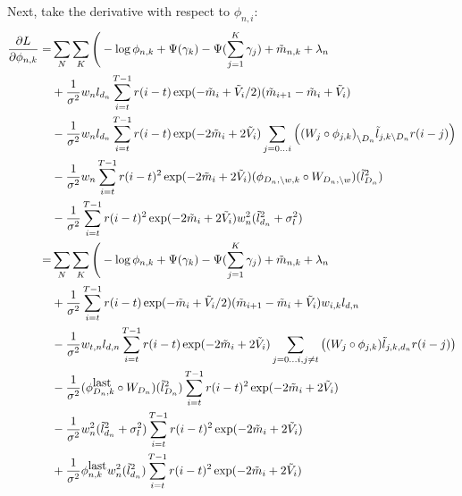 Next, take the derivative with respect to $\phi_{n,i}$:
\begin{align}
  \label{eq:phi_term}
  \frac{\partial L}{\partial \phi_{n,k}}
 = & \sum_N \sum_K \Bigg( -\log{\phi_{n,k}} + \Psi(\gamma_k) - \Psi(\sum_{j=1}^K \gamma_j) + \tilde{m}_{n,k} + \lambda_n \\  \nonumber
&  + \frac{1}{\sigma^2} w_{n} l_{d_n} \sum_{i=t}^{T-1} r(i-t) \exp(-\tilde{m}_i + \tilde{V}_i / 2) (\tilde{m}_{i + 1} - \tilde{m}_i + \tilde{V}_i) \\  \nonumber
&  - \frac{1}{\sigma^2} w_{n} l_{d_n} \sum_{i=t}^{T-1} r(i-t) \exp(-2\tilde{m}_i + 2 \tilde{V}_i) \sum_{j=0\ldots i} \left( {({W_j} \circ {\phi_{j,k}})}_{\setminus D_n} \tilde{l}_{j,k\setminus D_n} r(i-j) \right) \\  \nonumber
&  - \frac{1}{\sigma^2} w_{n} \sum_{i=t}^{T-1} r(i-t)^2 \exp(-2\tilde{m}_i + 2 \tilde{V}_i) (\phi_{D_n, \setminus w,k} \circ W_{D_n, \setminus w}) ({\tilde{l}}_{D_n}^2) \\  \nonumber
&  - \frac{1} {\sigma^2} \sum_{i=t}^{T-1} r(i-t)^2 \exp(-2\tilde{m}_i + 2 \tilde{V}_i) w_{n}^2 ({\tilde{l}}_{d_n}^2 + \sigma_l^2) \\  \nonumber
 = & \sum_N \sum_K \Bigg( -\log{\phi_{n,k}} + \Psi(\gamma_k) - \Psi(\sum_{j=1}^K \gamma_j) + \tilde{m}_{n,k} + \lambda_n \\  \nonumber
&  + \frac{1}{\sigma^2} \sum_{i=t}^{T-1} r(i-t) \exp(-\tilde{m}_i + \tilde{V}_i / 2) (\tilde{m}_{i + 1} - \tilde{m}_i + \tilde{V}_i) w_{i,k} l_{d,n} \\  \nonumber
&  - \frac{1} {\sigma^2} w_{t,n} l_{d,n} \sum_{i=t}^{T-1} r(i-t) \exp(-2\tilde{m}_i + 2 \tilde{V}_i) \sum_{j=0\ldots i, j \neq t} \left( (W_{j} \circ \phi_{j,k}) \tilde{l}_{j,k,d_n} r(i-j) \right) \\  \nonumber
&  - \frac{1} {\sigma^2} (\phi_{D_n,k}^{\mbox{last}} \circ W_{D_n}) (\tilde{l}_{D_n}^2) \sum_{i=t}^{T-1} r(i-t)^2 \exp(-2\tilde{m}_i + 2 \tilde{V}_i) \\  \nonumber
&  - \frac{1} {\sigma^2} w_{n}^2 (\tilde{l}_{d_n}^2 + \sigma_l^2) \sum_{i=t}^{T-1} r(i-t)^2 \exp(-2\tilde{m}_i + 2 \tilde{V}_i) \\  \nonumber
&  + \frac{1} {\sigma^2} \phi_{n,k}^{\mbox{last}} w_{n}^2 (\tilde{l}_{d_n}^2) \sum_{i=t}^{T-1} r(i-t)^2 \exp(-2\tilde{m}_i + 2 \tilde{V}_i)
\end{align}
